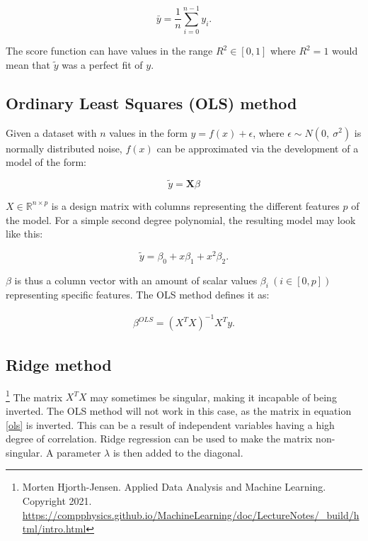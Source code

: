 \documentclass[reprint,english,notitlepage]{revtex4-1}  %
\begin{document}
\[
\bar{y} =  \frac{1}{n} \sum_{i=0}^{n - 1} y_i.
\]

The score function can have values in the range $R^2 \in [0, 1]$ where $R^2 = 1$ would mean that $\tilde{y}$ was a perfect fit of $y$.

\subsection{Ordinary Least Squares (OLS) method}

Given a dataset with $n$ values in the form $y = f(x) + \epsilon$, where $\epsilon \sim N(0, \ \sigma^2)$ is normally distributed noise, $f(x)$ can be approximated via the development of a model of the form:

\begin{equation} \label{eq:predict}
    \tilde{y} = \bm{X}\beta
\end{equation}


$X \in \mathbb{R}^{n \times p}$ is a design matrix with columns representing the different features $p$ of the model. For a simple second degree polynomial, the resulting model may look like this:

$$\tilde{y} = \beta_0 + x\beta_1 + x^2\beta_2.$$

$\beta$ is thus a column vector with an amount of scalar values $\beta_i \ (i \in [0, p])$ representing specific features. The OLS method defines it as:



\begin{align}
    \label{ols}
    \beta^{OLS} = (X^TX)^{-1}X^Ty.
\end{align}


\subsection{Ridge method}



\footnote{\label{ref1} Morten Hjorth-Jensen. Applied Data Analysis and Machine Learning. Copyright 2021. \url{https://compphysics.github.io/MachineLearning/doc/LectureNotes/_build/html/intro.html}} The matrix $X^TX$ may sometimes be singular, making it incapable of being inverted. The OLS method will not work in this case, as the matrix in equation \ref{ols} is inverted. This can be a result of independent variables having a high degree of correlation. Ridge regression can be used to make the matrix non-singular. A parameter $\lambda$ is then added to the diagonal.
\end{document}
